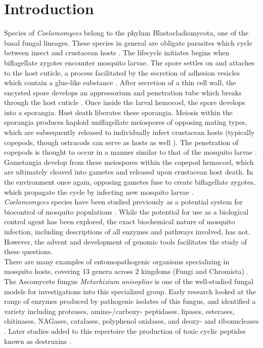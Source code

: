 \section{Introduction}
Species of \textit{Coelomomyces} belong to the phylum Blastocladiomycota, one of the basal fungal lineages. These species in general are obligate parasites which cycle between insect and crustacean hosts \cite{Whisler1975}. The lifecycle initiates begins when biflagellate zygotes encounter mosquito larvae. The spore settles on and attaches to the host cuticle, a process facilitated by the secretion of adhesion vesicles which contain a glue-like substance \cite{Travland1979}. After secretion of a thin cell wall, the encysted spore develops an appressorium and penetration tube which breaks through the host cuticle \cite{Zebold1979}. Once inside the larval hemocoel, the spore develops into a sporangia. Host death liberates these sporangia. Meiosis within the sporangia produces haploid uniflagellate meiospores of opposing mating types, which are subsequently released to individually infect crustacean hosts (typically copepods, though ostracods can serve as hosts as well \cite{Whisler2009}). The penetration of copepods is thought to occur in a manner similar to that of the mosquito larvae \cite{Zebold1979}. Gametangia develop from these meiospores within the copepod hemocoel, which are ultimately cleaved into gametes and released upon crustacean host death. In the environment once again, opposing gametes fuse to create biflagellate zygotes, which propagate the cycle by infecting new mosquito larvae \cite{Whisler1975}.\\
\indent \textit{Coelomomyces} species have been studied previously as a potential system for biocontrol of mosquito populations \cite{Scholte2004}. While the potential for use as a biological control agent has been explored, the exact biochemical nature of mosquito infection, including descriptions of all enzymes and pathways involved, has not. However, the advent and development of genomic tools facilitates the study of these questions.\\
\indent There are many examples of entomopathogenic organisms specializing in mosquito hosts, covering 13 genera across 2 kingdoms (Fungi and Chromista) \cite{Scholte2004}. The Ascomycete fungus \textit{Metarhizium anisopliae} is one of the well-studied fungal models for investigations into this specialized group. Early research looked at the range of enzymes produced by pathogenic isolates of this fungus, and identified a variety including proteases, amino-/carboxy- peptidases, lipases, esterases, chitinases, NAGases, catalases, polyphenol oxidases, and deoxy- and ribonucleases \cite{StLeger1986}. Later studies added to this repertoire the production of toxic cyclic peptides known as destruxins \cite{Wang2012}. \\
